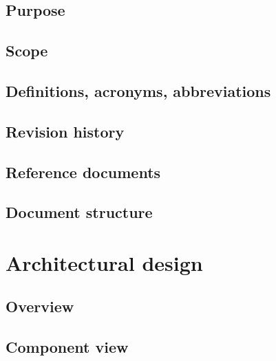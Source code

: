 \documentclass[10pt,english, openany]{book}
\begin{document}
\section{Purpose}



\section{Scope}



\section{Definitions, acronyms, abbreviations}



\section{Revision history}



\section{Reference documents}



\section{Document structure}



\chapter{Architectural design}

\section{Overview}



\section{Component view}
\end{document}
